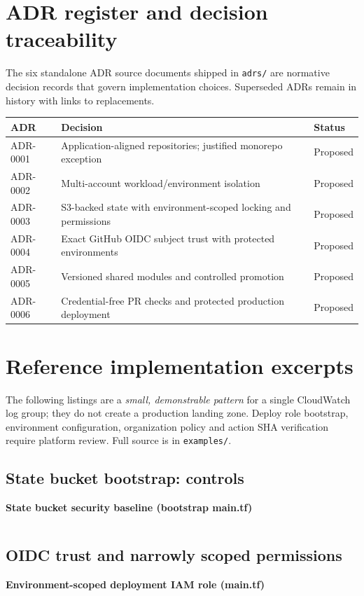 \documentclass[10pt,letterpaper]{article}
\begin{document}
\section{ADR register and decision traceability}
The six standalone ADR source documents shipped in \texttt{adrs/} are normative decision records that govern implementation choices. Superseded ADRs remain in history with links to replacements.
\begin{center}\small\begin{tabularx}{\linewidth}{@{}>{\raggedright\arraybackslash}p{23mm}>{\raggedright\arraybackslash}X >{\raggedright\arraybackslash}p{28mm}@{}}\toprule
ADR & Decision & Status\\\midrule
ADR-0001 & Application-aligned repositories; justified monorepo exception & Proposed\\
ADR-0002 & Multi-account workload/environment isolation & Proposed\\
ADR-0003 & S3-backed state with environment-scoped locking and permissions & Proposed\\
ADR-0004 & Exact GitHub OIDC subject trust with protected environments & Proposed\\
ADR-0005 & Versioned shared modules and controlled promotion & Proposed\\
ADR-0006 & Credential-free PR checks and protected production deployment & Proposed\\\bottomrule
\end{tabularx}\end{center}

\section{Reference implementation excerpts}
The following listings are a \emph{small, demonstrable pattern} for a single CloudWatch log group; they do not create a production landing zone. Deploy role bootstrap, environment configuration, organization policy and action SHA verification require platform review. Full source is in \texttt{examples/}.
\subsection{State bucket bootstrap: controls}
\noindent\textbf{State bucket security baseline (bootstrap main.tf)}\par
\inputminted[fontsize=\scriptsize,breaklines,breakanywhere,frame=lines]{text}{../examples/terraform/state-bootstrap/main.tf}
\subsection{OIDC trust and narrowly scoped permissions}
\noindent\textbf{Environment-scoped deployment IAM role (main.tf)}\par
\inputminted[fontsize=\scriptsize,breaklines,breakanywhere,frame=lines]{text}{../examples/terraform/oidc-deployment-role/main.tf}
\end{document}
